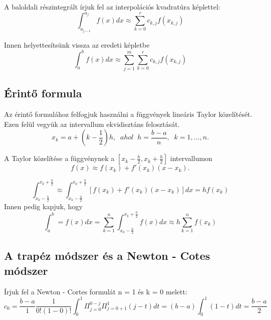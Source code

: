 \documentclass{article}
\theoremstyle{definition}
\theoremstyle{theorem}
\begin{document}
A baloldali részintegrált írjuk fel az interpolációs kvadratúra képlettel:
\begin{equation*}
\int_{a_{j-1}}^{a_j} f(x) dx \approx \sum_{k=0}^{r} c_{k,j}f(x_{k,j})
\end{equation*}

Innen helyettesítsünk vissza az eredeti képletbe
\begin{equation*}
\int_a^b f(x) dx \approx \sum_{j=1}^{m} \sum_{k=0}^{r} c_{k,j} f(x_{k,j})
\end{equation*}


\subsection{Érintő formula}

Az érintő formulához felfogjuk használni a függvények lineáris Taylor közelítését. Ezen felül vegyük az intervallum ekvidisztáns felosztását.
\begin{equation*}
   x_k = a + (k - \frac{1}{2})h ,\;\; ahol\;\; h = \frac{b-a}{n},\;\; k =1,...,n.
\end{equation*}



A Taylor közelítése a függvénynek a $[x_k-\frac{h}{2},x_k+\frac{h}{2}]$ intervallumon
\begin{equation*}
    f(x) \approx f(x_k)+f'(x_k)(x-x_k).
\end{equation*}

\begin{equation*}
\int_{x_k-\frac{h}{2}}^{x_k + \frac{h}{2}} \approx \int_{x_k - \frac{h}{2}}^{x_k + \frac{h}{2}} [f(x_k) + f'(x_k)(x-x_k)] dx = hf(x_k)
\end{equation*}
\newline
Innen pedig kapjuk, hogy
\begin{equation*}
\int_a^b = f(x) dx = \sum_{k=1}^n \int_{x_k - \frac{h}{2}}^{x_k + \frac{h}{2}} f(x)dx \approx h \sum_{k=1}^n f(x_k)
\end{equation*}



\subsection{A trapéz módszer és a Newton - Cotes módszer}
Írjuk fel a Newton - Cortes formulát n = 1 és k = 0 melett:
\begin{equation*}
c_0 = \frac{b-a}{1} \frac{1}{0!(1-0)!} \int_0^{1} \Pi_{j=0}^{0-j} \Pi_{j=0+1}^{1} (j-t) dt = (b-a) \int_0^1 (1-t) dt = \frac{b-a}{2}
\end{equation*}
\end{document}
